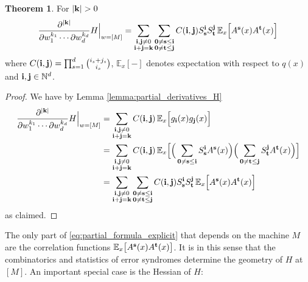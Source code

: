 \documentclass[english,letter paper,12pt,reqno]{article}
\theoremstyle{definition}
\newtheorem{theorem}{Theorem}[section]
\def\be{\begin{equation}}
\def\ee{\end{equation}}
\begin{document}
\begin{theorem}\label{theorem:partial_formula_explicit} For $|\bold{k}| > 0$
\be\label{eq:partial_formula_explicit}
\frac{\partial^{|\bold{k}|}}{ \partial w_1^{k_1} \cdots \partial w_d^{k_d}} H \Bigr|_{w = [M]} = \sum_{\substack{\bold{i},\bold{j} \neq 0 \\ \bold{i} + \bold{j} = \bold{k}}} \sum_{\substack{\bold{0} \neq \bold{s} \le \bold{i}\\ \bold{0} \neq \bold{t} \le \bold{j}}} C(\bold{i}, \bold{j})  S^{\bold{i}}_{\bold{s}} S^{\bold{j}}_{\bold{t}} \,\mathbb{E}_x\Big[ A^{\bold{s}}(x) A^{\bold{t}}(x) \Big]
\ee
where $C(\bold{i}, \bold{j}) = \prod_{s=1}^d \binom{i_s + j_s}{i_s}$, $\mathbb{E}_x[-]$ denotes expectation with respect to $q(x)$ and $\bold{i}, \bold{j} \in \mathbb{N}^d$.
\end{theorem}
\begin{proof}
We have by Lemma \ref{lemma:partial_derivatives_H}
\begin{align}
\frac{\partial^{|\bold{k}|}}{ \partial w_1^{k_1} \cdots \partial w_d^{k_d}} H \Bigr|_{w = [M]} &= \sum_{\substack{\bold{i},\bold{j} \neq 0 \\ \bold{i} + \bold{j} = \bold{k}}} C(\bold{i}, \bold{j})\, \mathbb{E}_x\Big[ g_{\bold{i}}(x) g_{\bold{j}}(x) \Big] \nonumber\\
&= \sum_{\substack{\bold{i},\bold{j} \neq 0 \\ \bold{i} + \bold{j} = \bold{k}}} C(\bold{i}, \bold{j})\,\mathbb{E}_x\Big[ \Big(\sum_{\bold{0} \neq \bold{s} \le \bold{i}} S^{\bold{i}}_{\bold{s}} A^{\bold{s}}(x) \Big) \Big(\sum_{\bold{0} \neq \bold{t} \le \bold{j}} S^{\bold{j}}_{\bold{t}} A^{\bold{t}}(x) \Big) \Big] \nonumber\\
&= \sum_{\substack{\bold{i},\bold{j} \neq 0 \\ \bold{i} + \bold{j} = \bold{k}}} \sum_{\substack{\bold{0} \neq \bold{s} \le \bold{i}\\ \bold{0} \neq \bold{t} \le \bold{j}}} C(\bold{i}, \bold{j})  S^{\bold{i}}_{\bold{s}} S^{\bold{j}}_{\bold{t}} \,\mathbb{E}_x\Big[ A^{\bold{s}}(x) A^{\bold{t}}(x) \Big]
\end{align}
as claimed.
\end{proof}

The only part of \eqref{eq:partial_formula_explicit} that depends on the machine $M$ are the correlation functions $\mathbb{E}_x\big[ A^{\bold{s}}(x) A^{\bold{t}}(x) \big]$. It is in this sense that the combinatorics and statistics of error syndromes determine the geometry of $H$ at $[M]$. An important special case is the Hessian of $H$:
\end{document}
